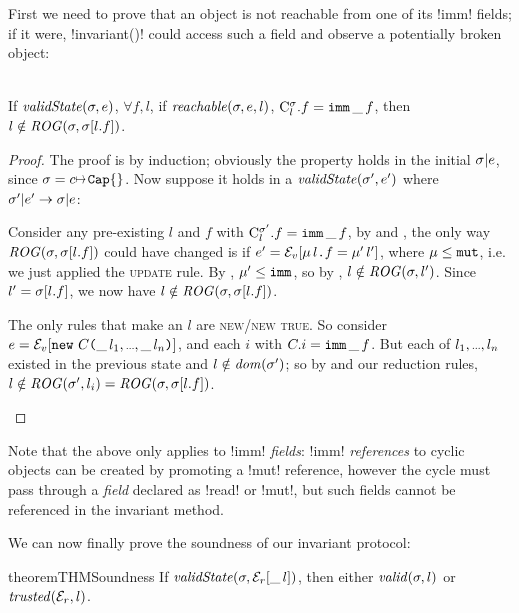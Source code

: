 First we need to prove that an object is not reachable from one of its \Q!imm! fields; if it were, \Q!invariant()! could access such a field and observe a potentially broken object:\SS
\begin{Lemma}\ \\
\indent If $\VS(\s, e)$, $\forall f,l$, if $\reach(\s, e, l)$, $\C{l}.f = \field{\Kw{imm}}{\_}{f}$, then $l \notin \rog(\s, \s[l.f])$.
\end{Lemma}\SS
\begin{proof}
The proof is by induction; obviously the property holds in the initial $\s|e$, since $\s = c\mapsto \Kw{Cap}\{\}$. Now suppose it holds in a $\VS(\s', e')$ where $\s'|e' \rightarrow \s|e$:
\begin{ienumerate}
	\item Consider any pre-existing \reach $l$ and $f$ with $\C[\s']{l}.f = \field{\Kw{imm}}{\_}{f}$, by  and , the only way $\rog(\s, \s[l.f])$ could have changed is if $e' = \EV[\mdf\,l\D f = \mdf'\,l']$, where $\mdf \leq \Kw{mut}$, i.e. we just applied the \textsc{update} rule. By , $\mdf' \leq \Kw{imm}$, so by , $l \notin \rog(\s, l')$. Since $l' = \s[l.f]$, we now have $l \notin \rog(\s, \s[l.f])$.
	\item The only rules that make an $l$ \reach are \textsc{new/new true}. So consider $e = \EV[\new{C}{\range{\_\,l}}]$, and each $i$ with $C.i = \field{\Kw{imm}}{\_}{f}$. But each of $\range{l}$ existed in the previous state and $l \notin \dom(\s')$; so by \VS and our reduction rules, $l \notin \rog(\s', l_i) = \rog(\s, \s[l.f])$.
\end{ienumerate}
\end{proof}
\noindent Note that the above only applies to \Q!imm! \emph{fields}: \Q!imm! \emph{references} to cyclic objects can be created by promoting a \Q!mut! reference, however the cycle must pass through a \emph{field} declared as \Q!read! or \Q!mut!, but such fields cannot be referenced in the invariant method.

\LS

We can now finally prove the soundness of our invariant protocol:
\SS%
\begin{restatable}[Soundness]{theorem}{THMSoundness} %
	If $\VS(\s, \ER[\_\,l])$, then either $\valid(\s,l)$ or $\trusted(\ER,l)$.
\end{restatable}%
\SS

